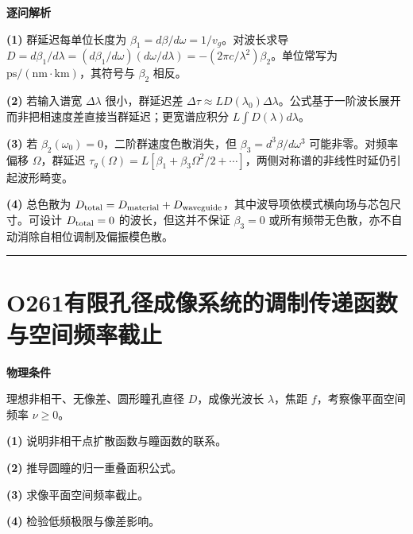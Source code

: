 \documentclass[UTF8,a4paper,11pt,oneside,openany]{ctexbook}
\begin{document}
\par\medskip\noindent\textbf{逐问解析}
\par\noindent\textbf{(1)} 群延迟每单位长度为 \(\beta_1=d\beta/d\omega=1/v_g\)。对波长求导 \(D=d\beta_1/d\lambda=(d\beta_1/d\omega)(d\omega/d\lambda)=-(2\pi c/\lambda^2)\beta_2\)。单位常写为 \(\mathrm{ps/(nm\cdot km)}\)，其符号与 \(\beta_2\) 相反。
\par\noindent\textbf{(2)} 若输入谱宽 \(\Delta\lambda\) 很小，群延迟差 \(\Delta\tau\approx L D(\lambda_0)\Delta\lambda\)。公式基于一阶波长展开而非把相速度差直接当群延迟；更宽谱应积分 \(L\int D(\lambda)d\lambda\)。
\par\noindent\textbf{(3)} 若 \(\beta_2(\omega_0)=0\)，二阶群速度色散消失，但 \(\beta_3=d^3\beta/d\omega^3\) 可能非零。对频率偏移 \(\Omega\)，群延迟 \(\tau_g(\Omega)=L[\beta_1+\beta_3\Omega^2/2+\cdots]\)，两侧对称谱的非线性时延仍引起波形畸变。
\par\noindent\textbf{(4)} 总色散为 \(D_{\rm total}=D_{\rm material}+D_{\rm waveguide}\)，其中波导项依模式横向场与芯包尺寸。可设计 \(D_{\rm total}=0\) 的波长，但这并不保证 \(\beta_3=0\) 或所有频带无色散，亦不自动消除自相位调制及偏振模色散。

\par\bigskip\hrule\bigskip
\section*{O261\quad 有限孔径成像系统的调制传递函数与空间频率截止}
\textbf{物理条件}\par 理想非相干、无像差、圆形瞳孔直径 \(D\)，成像光波长 \(\lambda\)，焦距 \(f\)，考察像平面空间频率 \(\nu\ge0\)。
\par\noindent\textbf{(1)} 说明非相干点扩散函数与瞳函数的联系。
\par\noindent\textbf{(2)} 推导圆瞳的归一重叠面积公式。
\par\noindent\textbf{(3)} 求像平面空间频率截止。
\par\noindent\textbf{(4)} 检验低频极限与像差影响。
\end{document}
